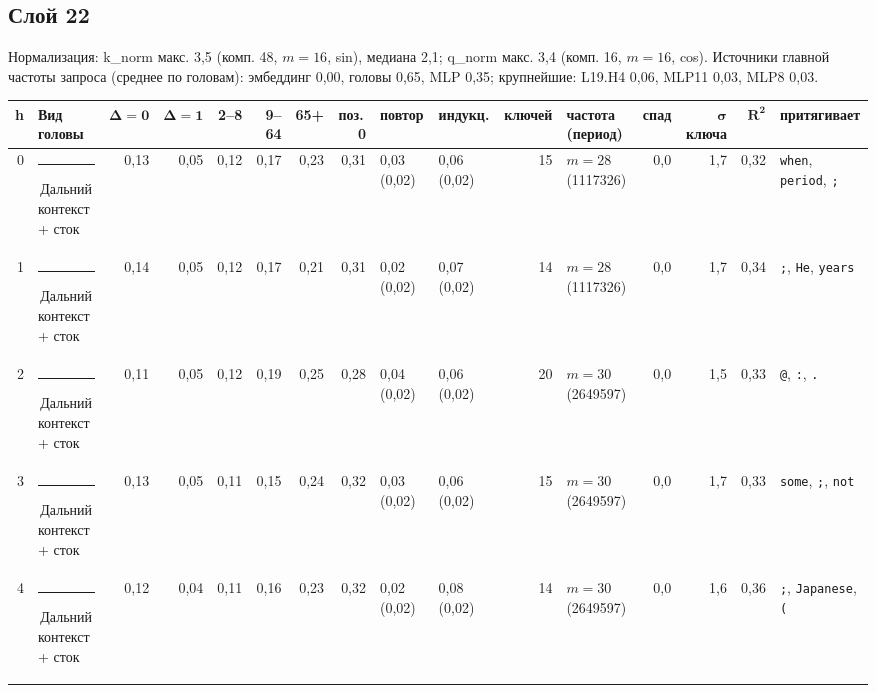 \documentclass[10pt]{article}
\begin{document}
\noindent\begin{minipage}{\linewidth}
\subsection*{Слой 22}
{\small\color{ink2} Нормализация: k\_norm макс. 3,5 (комп. 48, $m{=}16$, sin), медиана 2,1; q\_norm макс. 3,4 (комп. 16, $m{=}16$, cos). Источники главной частоты запроса (среднее по головам): эмбеддинг 0,00, головы 0,65, MLP 0,35; крупнейшие: L19.H4 0,06, MLP11 0,03, MLP8 0,03.}
\begin{center}{\footnotesize\begin{tabular}{|r|l|r|r|r|r|r|r|l|l|r|l|r|r|r|l|}
\hline
\rowcolor{head}\textbf{h} & \textbf{Вид головы} & $\boldsymbol{\Delta{=}0}$ & $\boldsymbol{\Delta{=}1}$ & \textbf{2–8} & \textbf{9–64} & \textbf{65+} & \textbf{поз.\,0} & \textbf{повтор} & \textbf{индукц.} & \textbf{ключей} & \textbf{частота (период)} & \textbf{спад} & $\boldsymbol{\sigma}$ \textbf{ключа} & $\boldsymbol{R^2}$ & \textbf{притягивает} \\ \hline
0 & \textcolor[HTML]{C3C2B7}{\rule{0.62em}{0.62em}}\,Дальний контекст + сток & 0,13 & 0,05 & 0,12 & 0,17 & 0,23 & 0,31 & 0,03 (0,02) & 0,06 (0,02) & 15 & $m{=}28$ (1117326) & 0,0 & 1,7 & 0,32 & \texttt{\textvisiblespace{}when}, \texttt{\textvisiblespace{}period}, \texttt{\textvisiblespace{};} \\ \hline
1 & \textcolor[HTML]{C3C2B7}{\rule{0.62em}{0.62em}}\,Дальний контекст + сток & 0,14 & 0,05 & 0,12 & 0,17 & 0,21 & 0,31 & 0,02 (0,02) & 0,07 (0,02) & 14 & $m{=}28$ (1117326) & 0,0 & 1,7 & 0,34 & \texttt{\textvisiblespace{};}, \texttt{\textvisiblespace{}He}, \texttt{\textvisiblespace{}years} \\ \hline
2 & \textcolor[HTML]{C3C2B7}{\rule{0.62em}{0.62em}}\,Дальний контекст + сток & 0,11 & 0,05 & 0,12 & 0,19 & 0,25 & 0,28 & 0,04 (0,02) & 0,06 (0,02) & 20 & $m{=}30$ (2649597) & 0,0 & 1,5 & 0,33 & \texttt{\textvisiblespace{}@}, \texttt{\textvisiblespace{}:}, \texttt{\textvisiblespace{}.} \\ \hline
3 & \textcolor[HTML]{C3C2B7}{\rule{0.62em}{0.62em}}\,Дальний контекст + сток & 0,13 & 0,05 & 0,11 & 0,15 & 0,24 & 0,32 & 0,03 (0,02) & 0,06 (0,02) & 15 & $m{=}30$ (2649597) & 0,0 & 1,7 & 0,33 & \texttt{\textvisiblespace{}some}, \texttt{\textvisiblespace{};}, \texttt{\textvisiblespace{}not} \\ \hline
4 & \textcolor[HTML]{C3C2B7}{\rule{0.62em}{0.62em}}\,Дальний контекст + сток & 0,12 & 0,04 & 0,11 & 0,16 & 0,23 & 0,32 & 0,02 (0,02) & 0,08 (0,02) & 14 & $m{=}30$ (2649597) & 0,0 & 1,6 & 0,36 & \texttt{\textvisiblespace{};}, \texttt{\textvisiblespace{}Japanese}, \texttt{\textvisiblespace{}(} \\ \hline

\end{tabular}}
\end{center}
\end{minipage}
\end{document}
